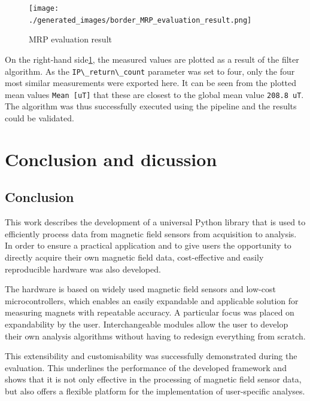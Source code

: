 \begin{figure}
\centering
\texttt{[image: ./generated\_images/border\_MRP\_evaluation\_result.png]}
\caption{MRP evaluation result \label{MRP_evaluation_result.png}}
\end{figure}

On the right-hand side\ref{MRP_evaluation_result.png}, the measured
values are plotted as a result of the filter algorithm. As the
\passthrough{\lstinline!IP\_return\_count!} parameter was set to four,
only the four most similar measurements were exported here. It can be
seen from the plotted mean values \passthrough{\lstinline!Mean [uT]!}
that these are closest to the global mean value
\passthrough{\lstinline!208.8 uT!}. The algorithm was thus successfully
executed using the pipeline and the results could be validated.

\hypertarget{conclusion-and-dicussion}{%
\chapter{Conclusion and dicussion}\label{conclusion-and-dicussion}}

\hypertarget{conclusion}{%
\section{Conclusion}\label{conclusion}}

This work describes the development of a universal Python library that
is used to efficiently process data from magnetic field sensors from
acquisition to analysis. In order to ensure a practical application and
to give users the opportunity to directly acquire their own magnetic
field data, cost-effective and easily reproducible hardware was also
developed.

The hardware is based on widely used magnetic field sensors and low-cost
microcontrollers, which enables an easily expandable and applicable
solution for measuring magnets with repeatable accuracy. A particular
focus was placed on expandability by the user. Interchangeable modules
allow the user to develop their own analysis algorithms without having
to redesign everything from scratch.

This extensibility and customisability was successfully demonstrated
during the evaluation. This underlines the performance of the developed
framework and shows that it is not only effective in the processing of
magnetic field sensor data, but also offers a flexible platform for the
implementation of user-specific analyses.


